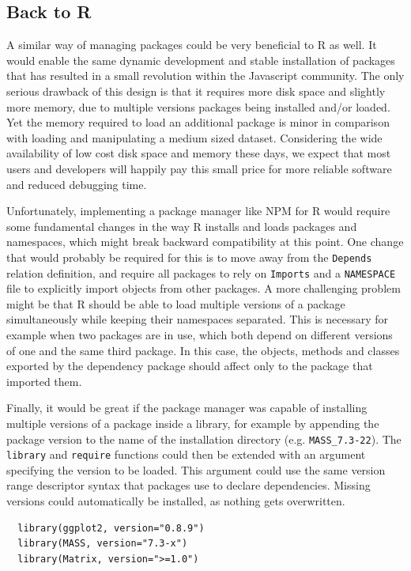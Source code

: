 \subsection{Back to R}

A similar way of managing packages could be very beneficial to R as well. It would
enable the same dynamic development and stable installation of packages that has
resulted in a small revolution within the Javascript community. The only serious
drawback of this design is that it requires more disk space and slightly
more memory, due to multiple versions packages being installed and/or loaded.
Yet the memory required to load an additional package is minor in comparison
with loading and manipulating a medium sized dataset. Considering the wide
availability of low cost disk space and memory these days, we expect that most
users and developers will happily pay this small price for more reliable
software and reduced debugging time. 

Unfortunately, implementing a package manager like NPM for R would require some
fundamental changes in the way R installs and loads packages and namespaces,
which might break backward compatibility at this point. One change that would
probably be required for this is to move away from the \texttt{Depends}
relation definition, and require all packages to rely on \texttt{Imports} and a
\texttt{NAMESPACE} file to explicitly import objects from other packages. A
more challenging problem might be that R should be able to load multiple
versions of a package simultaneously while keeping their namespaces separated.
This is necessary for example when two packages are in use, which
both depend on different versions of one and the same third package. In this
case, the objects, methods and classes exported by the dependency package
should affect only to the package that imported them.

Finally, it would be great if the package manager was capable of installing
multiple versions of a package inside a library, for example by appending
the package version to the name of the installation directory (e.g. \texttt{MASS\_7.3-22}).
The \texttt{library} and \texttt{require} functions could then be extended with
an argument specifying the version to be loaded. This argument could use the
same version range descriptor syntax that packages use to declare dependencies.
Missing versions could automatically be installed, as nothing gets overwritten.

\begin{verbatim}
  library(ggplot2, version="0.8.9")
  library(MASS, version="7.3-x")
  library(Matrix, version=">=1.0")
\end{verbatim}

